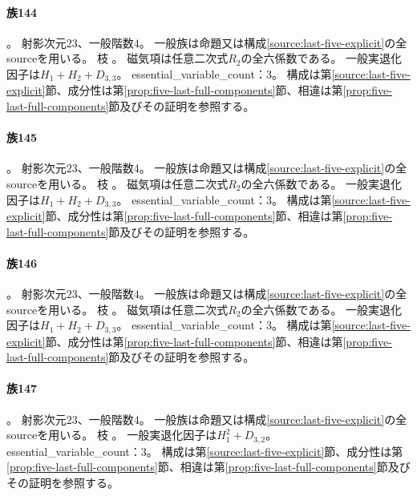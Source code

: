 \paragraph{族144}\label{catalogue:R4_PLANE_TWO_LINES_CUBIC_NODE_FLEX_TANGENT_THROUGH_FLEX_23}
。
射影次元$23$、一般階数$4$。
一般族は命題又は構成\ref{source:last-five-explicit}の全sourceを用いる。
枝 。
磁気項は任意二次式$R_2$の全六係数である。
一般実退化因子は$H_{1}+H_{2}+D_{3,3}$。
essential\_variable\_count：3。
構成は第\ref{source:last-five-explicit}節、成分性は第\ref{prop:five-last-full-components}節、相違は第\ref{prop:five-last-full-components}節及びその証明を参照する。

\paragraph{族145}\label{catalogue:R4_PLANE_TWO_LINES_CUBIC_CUSP_FLEX_SECANT_THROUGH_FLEX_23}
。
射影次元$23$、一般階数$4$。
一般族は命題又は構成\ref{source:last-five-explicit}の全sourceを用いる。
枝 。
磁気項は任意二次式$R_2$の全六係数である。
一般実退化因子は$H_{1}+H_{2}+D_{3,3}$。
essential\_variable\_count：3。
構成は第\ref{source:last-five-explicit}節、成分性は第\ref{prop:five-last-full-components}節、相違は第\ref{prop:five-last-full-components}節及びその証明を参照する。

\paragraph{族146}\label{catalogue:R4_PLANE_TWO_LINES_CUBIC_CUSP_CUSP_TANGENT_CUSP_SECANT_23}
。
射影次元$23$、一般階数$4$。
一般族は命題又は構成\ref{source:last-five-explicit}の全sourceを用いる。
枝 。
磁気項は任意二次式$R_2$の全六係数である。
一般実退化因子は$H_{1}+H_{2}+D_{3,3}$。
essential\_variable\_count：3。
構成は第\ref{source:last-five-explicit}節、成分性は第\ref{prop:five-last-full-components}節、相違は第\ref{prop:five-last-full-components}節及びその証明を参照する。

\paragraph{族147}\label{catalogue:R4_CONSTANT_MODULAR_DOUBLE_LINE_CUBIC_23}
。
射影次元$23$、一般階数$4$。
一般族は命題又は構成\ref{source:last-five-explicit}の全sourceを用いる。
枝 。
一般実退化因子は$H_{1}^{2}+D_{3,2}$。
essential\_variable\_count：3。
構成は第\ref{source:last-five-explicit}節、成分性は第\ref{prop:five-last-full-components}節、相違は第\ref{prop:five-last-full-components}節及びその証明を参照する。

